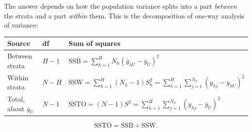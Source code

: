 \documentclass[
  letterpaper,
  DIV=11,
  numbers=noendperiod]{scrreprt}
\newcounter{none} %
\renewcommand{\[}{\begin{equation}}
\renewcommand{\]}{\end{equation}}
\begin{document}
The answer depends on how the population variance splits into a part
\emph{between} the strata and a part \emph{within} them. This is the
decomposition of one-way analysis of variance:

{\def\LTcaptype{none} %
\begin{longtable}[]{@{}
  >{\raggedright\arraybackslash}p{}
  >{\centering\arraybackslash}p{}
  >{\raggedright\arraybackslash}p{}@{}}
\toprule\noalign{}
\begin{minipage}[b]{\linewidth}\raggedright
Source
\end{minipage} & \begin{minipage}[b]{\linewidth}\centering
df
\end{minipage} & \begin{minipage}[b]{\linewidth}\raggedright
Sum of squares
\end{minipage} \\
\midrule\noalign{}
\endhead
\bottomrule\noalign{}
\endlastfoot
Between strata & \(H-1\) &
\(\text{SSB} = \sum_{h=1}^H N_h(\overline y_{hU}-\overline y_U)^2\) \\
Within strata & \(N-H\) &
\(\text{SSW} = \sum_{h=1}^H (N_h-1)S_h^2 = \sum_{h=1}^H\sum_{j=1}^{N_h}(y_{hj}-\overline y_{hU})^2\) \\
Total, about \(\overline y_U\) & \(N-1\) &
\(\text{SSTO} = (N-1)S^2 = \sum_{h=1}^H\sum_{j=1}^{N_h}(y_{hj}-\overline y_U)^2\) \\
\end{longtable}
}

\[
\text{SSTO} = \text{SSB} + \text{SSW}.
\]
\end{document}
